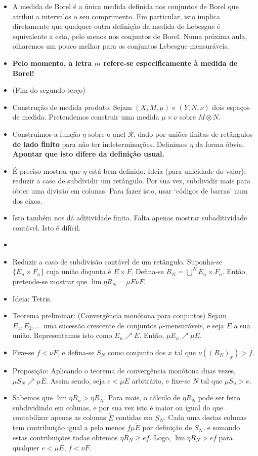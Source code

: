 \documentclass{article}
\begin{document}
\begin{itemize}
\item A medida de Borel é a única medida definida nos conjuntos de Borel que atribui a intervalos o seu comprimento. Em particular, isto implica diretamente que qualquer outra definição da medida de Lebesgue é equivalente a esta, pelo menos nos conjuntos de Borel. Numa próxima aula, olharemos um pouco melhor para os conjuntos Lebesgue-mensuráveis.
\item \textbf{Pelo momento, a letra $m$ refere-se especificamente à medida de Borel!}
\item (Fim do segundo terço)
\item Construção de medida produto. Sejam $(X,M,\mu)$ e $(Y,N,\nu)$ dois espaços de medida. Pretendemos construir uma medida $\mu \times \nu$ sobre $M \otimes N$.
\item Construimos a função $\eta$ sobre o anel $\mathcal R$, dado por uniões finitas de retângulos \textbf{de lado finito} para não ter indeterminações. Definimos $\eta$ da forma óbvia. \textbf{Apontar que isto difere da definição usual.}
\item É preciso mostrar que $\eta$ está bem-definido. Ideia (para unicidade do valor): reduzir a caso de subdividir um retângulo. Por sua vez, subdividir mais para obter uma divisão em colunas. Para fazer isto, usar `códigos de barras' num dos eixos.
\item Isto também nos dá aditividade finita. Falta apenas mostrar subaditividade contável. Isto é difícil.
\item{}
\item Reduzir a caso de subdivisão contável de um retângulo. Suponha-se $\{E_n\times F_n\}$ cuja união disjunta é $E \times F$. Defina-se $R_N = \bigcup^N E_n \times F_n$. Então, pretende-se mostrar que $\lim \eta R_N = \mu E \nu F$.
\item Ideia: Tetris.
\item Teorema preliminar: (Convergência monótona para conjuntos) Sejam $E_1, E_2, \dots$ uma sucessão crescente de conjuntos $\mu$-mensuráveis, e seja $E$ a sua união. Representamos isto como $E_n \nearrow E$. Então, $\mu E_n \nearrow \mu E$.
\item Fixe-se $f < \nu F$, e defina-se $S_N$ como conjunto dos $x$ tal que $\nu((R_N)_x) > f$.
\item Proposição: Aplicando o teorema de convergência monótona duas vezes, $\mu S_N \nearrow \mu E$. Assim sendo, seja $e < \mu E$ arbitrário, e fixe-se $N$ tal que $\mu S_n > e$.
\item Sabemos que $\lim \eta R_n > \eta R_N$. Para mais, o cálculo de $\eta R_N$ pode ser feito subdividindo em colunas, e por sua vez isto é maior ou igual do que contabilizar apenas as colunas $\tilde E$ contidas em $S_N$. Cada uma destas colunas tem contribuição igual a pelo menos $f \mu \tilde E$ por definição de $S_N$, e somando estas contribuições todas obtemos $\eta R_N \geq e f$. Logo, $\lim \eta R_N > e f$ para qualquer $e<\mu E$, $f < \nu F$.

\end{itemize}
\end{document}
